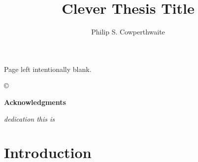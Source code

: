 \documentclass[plain]{hvdthesis}
\author{Philip S. Cowperthwaite}
\title{Clever Thesis Title}
\begin{document}
% 

\clearpage
\thispagestyle{empty}
\begin{center}
\vspace*{\fill}
Page left intentionally blank.
\vspace*{\fill}
\end{center}

\frontmatter

\makecover
\copyright

%
{\singlespace
\tableofcontents
}
\newpage
\clearpage


\newpage
%
\thispagestyle{plain}

\vskip 0.5cm
{\centerline {\Large \bf Acknowledgments}}
\vskip 0.5cm
\normalsize




\clearpage
%
\thispagestyle{plain}

\vspace*{\fill}
{\centerline {\em dedication this is}}
\vspace*{\fill}


\mainmatter
\pagestyle{fancy}


%
%

\chapter[Introduction]{Introduction}\label{c:intro}

\clearpage
%
\end{document}
